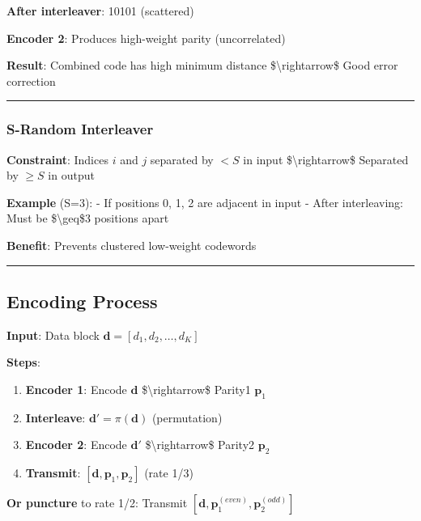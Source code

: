 \textbf{After interleaver}: 10101 (scattered)

\textbf{Encoder 2}: Produces high-weight parity (uncorrelated)

\textbf{Result}: Combined code has high minimum distance
\$\textbackslash rightarrow\$ Good error correction

\begin{center}\rule{0.5\linewidth}{0.5pt}\end{center}

\subsubsection{S-Random Interleaver}\label{s-random-interleaver}

\textbf{Constraint}: Indices \(i\) and \(j\) separated by \(< S\) in
input \$\textbackslash rightarrow\$ Separated by \(\geq S\) in output

\textbf{Example} (S=3): - If positions 0, 1, 2 are adjacent in input -
After interleaving: Must be \$\textbackslash geq\$3 positions apart

\textbf{Benefit}: Prevents clustered low-weight codewords

\begin{center}\rule{0.5\linewidth}{0.5pt}\end{center}

\subsection{Encoding Process}\label{encoding-process}

\textbf{Input}: Data block \(\mathbf{d} = [d_1, d_2, \ldots, d_K]\)

\textbf{Steps}:

\begin{enumerate}
\def\labelenumi{\arabic{enumi}.}
\tightlist
\item
  \textbf{Encoder 1}: Encode \(\mathbf{d}\)
  \$\textbackslash rightarrow\$ Parity1 \(\mathbf{p}_1\)
\item
  \textbf{Interleave}: \(\mathbf{d}' = \pi(\mathbf{d})\) (permutation)
\item
  \textbf{Encoder 2}: Encode \(\mathbf{d}'\)
  \$\textbackslash rightarrow\$ Parity2 \(\mathbf{p}_2\)
\item
  \textbf{Transmit}: \([\mathbf{d}, \mathbf{p}_1, \mathbf{p}_2]\) (rate
  1/3)
\end{enumerate}

\textbf{Or puncture} to rate 1/2: Transmit
\([\mathbf{d}, \mathbf{p}_1^{(even)}, \mathbf{p}_2^{(odd)}]\)

